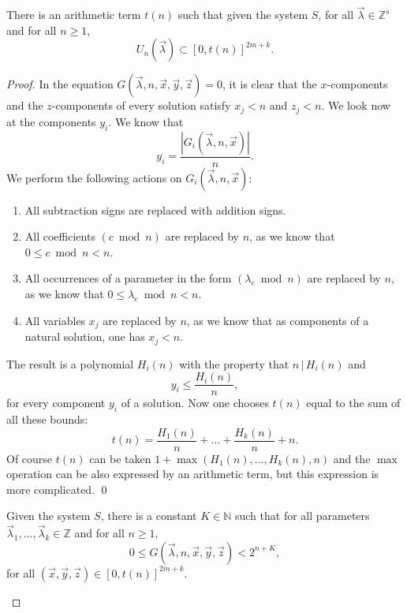 \documentclass[10pt,a4paper]{amsart}
\begin{document}
\begin{lemma}\label{lem:sufficientt}
   There is an arithmetic term $t(n)$ such that given the system $S$, for all $\vec \lambda \in \mathbb Z^s$ and for all $n \geq 1$, 
   $$U_n(\vec \lambda ) \subset [0, t(n)]^{2m + k}.$$
\end{lemma} 

\begin{proof} In the equation $G(\vec \lambda, n, \vec x, \vec y, \vec z) = 0$, it is clear that the $x$-components and the $z$-components of every solution satisfy $x_j < n$ and $z_j < n$. We look now at the components $y_i$. We know that
$$y_i = \frac{|G_i(\vec \lambda, n, \vec x)|}{n}.$$
We perform the following actions on $G_i(\vec \lambda, n, \vec x)$:
\begin{enumerate}
    \item All subtraction signs are replaced with addition signs.
    \item All coefficients $(c \bmod n)$ are replaced by $n$, as we know that $0 \leq c \bmod n < n$.
    \item All occurrences of a parameter in the form $(\lambda_{e} \bmod n) $ are replaced by $n$, as we know that $0 \leq \lambda_e \bmod n < n$.
    \item All variables $x_j$ are replaced by $n$, as we know that as components of a natural solution, one has $x_j < n$. 
\end{enumerate} 
The result is a polynomial $H_i(n)$ with the property that $n \,|\,H_i(n)$ and
$$y_i \le \frac{H_i(n)}{n},$$
for every component $y_i$ of a solution. Now one chooses $t(n)$ equal to the sum of all these bounds:
$$t(n) = \frac{H_1(n)}{n}+ \dots + \frac{H_k(n)}{n} + n.$$
Of course $t(n)$ can be taken $1 + \max(H_1(n), \dots, H_k(n), n)$ and the $\max$ operation can be also expressed by an arithmetic term, but this expression is more complicated. 
\qed 

\begin{lemma}
    Given the system $S$, there is a constant $K \in \mathbb N$ such that for all parameters $\vec \lambda_1, \dots, \vec \lambda_k \in \mathbb Z$ and for all $n \geq 1$, 
    $$0 \leq G(\vec \lambda, n, \vec x, \vec y, \vec z) < 2^{n+K},$$
    for all $(\vec x, \vec y, \vec z) \in [0, t(n)]^{2m + k}$. 
\end{lemma} 


\end{proof}
\end{document}

